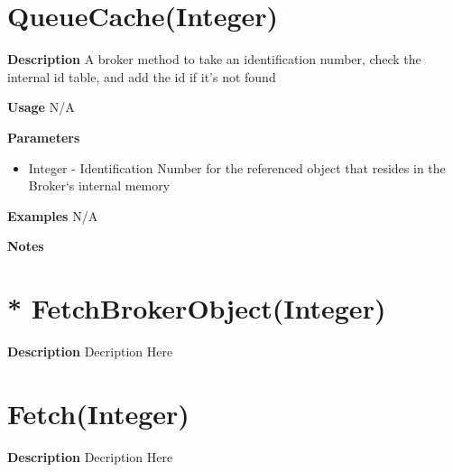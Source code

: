 \documentclass[letterpaper,12pt]{report}
\begin{document}
{
\pagebreak
\section{QueueCache(Integer)}
    \begin{description}
     \item \textbf{Description} 
	\newline \hspace*{1cm} A broker method to take an identification number, check the internal id table, and add the id if it's not found
     \item \textbf{Usage}
	\newline \hspace*{1cm} N/A
     \item \textbf{Parameters}
	\begin{itemize}
	   \item Integer - Identification Number for the referenced object that resides in the Broker`s internal memory
	\end{itemize}
     \item \textbf{Examples}
	\newline \hspace*{1cm} N/A
     \item \textbf{Notes}
	\par \noindent 
    \end{description}

}

{
\pagebreak
\section{* FetchBrokerObject(Integer)}
    \begin{description}
     \item \textbf{Description} 
	\newline \hspace*{1cm} Decription Here
    \end{description}

}

{
\pagebreak
\section{Fetch(Integer)}
    \begin{description}
     \item \textbf{Description} 
	\newline \hspace*{1cm} Decription Here
    \end{description}

}
\end{document}
